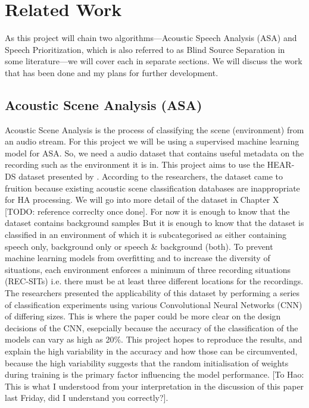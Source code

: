 \documentclass[logo,bsc,singlespacing,parskip,online]{infthesis}
\begin{document}


\section{Related Work}
As this project will chain two algorithms—Acoustic Speech Analysis (ASA) and Speech Prioritization, which is also referred to as Blind Source Separation in some literature—we will cover each in separate sections.
We will discuss the work that has been done and my plans for further development.

\subsection{Acoustic Scene Analysis (ASA)}
Acoustic Scene Analysis is the process of classifying the scene (environment) from an audio stream. For this project 
we will be using a supervised machine learning model for ASA. So, we need 
a audio dataset that contains useful metadata on the recording such as the environment it is in.
This project aims to use the HEAR-DS dataset presented by \citet{Huwel2020HearDS}. According to the researchers, 
the dataset came to fruition because existing acoustic scene classification databases are inappropriate for 
HA processing. We will go into more detail of the dataset in Chapter X [TODO: reference correclty once done]. 
For now it is enough to know that the dataset contains background samples 
But it is enough to know that the dataset is classified in an environment of which it is subcategorised as 
either containing speech only, background only or speech \& background (both). To prevent machine learning 
models from overfitting and to increase the diversity of situations, each environment enforces a minimum of three recording situations (REC-SITs) i.e.
there must be at least three different locations for the recordings. The researchers presented the applicability 
of this dataset by performing a series of classification experiments using various Convolutional Neural Networks (CNN) of differing sizes.
This is where the paper could be more clear on the design decisions of the CNN, esepcially because the accuracy of the classification of the models 
can vary as high as 20\%. This project hopes to reproduce the results, and explain the high variability in the accuracy and how those can be circumvented,
because the high variability suggests that the random initialisation of weights during training is the primary factor influencing the model performance.
[To Hao: This is what I understood from your interpretation in the discussion of this paper last Friday, did I understand you correctly?].
\end{document}
